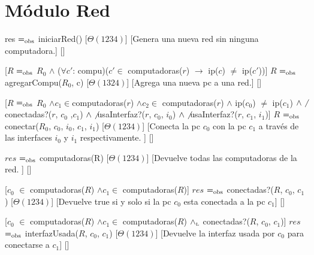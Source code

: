 \section{M\'{o}dulo Red}

\begin{Interfaz}
  

  

  {res $=_{\mathrm{obs}}$ iniciarRed()}%
  [$\Theta(1234)$]%
  [Genera una nueva red sin ninguna computadora.]%
  []%
  
  [$R$ $=_{\mathrm{obs}}$ $R_{0}$ $\land$ ($\forall c'$: compu)($c' \in$ computadoras($r$) $\rightarrow$ ip($c$) $\neq$ ip($c'$))]%
  {$R$ $=_{\mathrm{obs}}$ agregarCompu($R_{0}$, c)}%
  [$\Theta(1324)$]%
  [Agrega una nueva pc a una red.]%
  []%

  [$R$ $=_{\mathrm{obs}}$ $R_{0}$ $\land c_{1} \in $computadoras($r$) $\land c_{2} \in$ computadoras($r$) $\land$ ip($c_{0} $) $\neq$ ip($c_{1} $) $\land \not$conectadas?($r$, $c_{0}$ ,$c_{1} $) $\land \not$ usaInterfaz?($r$, $c_{0}$, $i_{0}$) $\land \not$ usaInterfaz?($r$, $c_{1}$, $i_{1}$)]%
  {$R$ $=_{\mathrm{obs}}$ conectar($R_{0}$, $c_{0}$, $i_{0}$, $c_{1}$, $i_{1}$)}%
  [$\Theta(1234)$]%
  [Conecta la pc $c_{0}$ con la pc $c_{1}$ a trav\'es de las interfaces $i_{0}$ y $i_{1}$ respectivamente. ]%
  []%
  
  {$res$ $=_{\mathrm{obs}}$ computadoras(R) } %
  [$\Theta(1234)$]%
  [Devuelve todas las computadoras de la red. ]%
  []%
  
  [$c_{0}$ $\in$ computadoras($R$) $\land c_{1} \in $ computadoras($R$)]%
  {$res$ $=_{\mathrm{obs}}$ conectadas?($R$, $c_{0}$, $c_{1}$)}%
  [$\Theta(1234)$]%
  [Devuelve true si y solo si la pc $c_{0}$ esta conectada a la pc $c_{1}$]%
  []%
  
  [$c_{0}$ $\in$ computadoras($R$) $\land c_{1} \in $ computadoras($R$) $\land_{\mathrm{\scriptscriptstyle{L}}}$ conectadas?($R$, $c_{0}$, $c_{1}$)]%
  {$res$ $=_{\mathrm{obs}}$ interfazUsada($R$, $c_{0}$, $c_{1}$)}%
  [$\Theta(1234)$]%
  [Devuelve la interfaz usada por $c_{0}$ para conectarse a $c_{1}$]%
  []%
  

\end{Interfaz}
